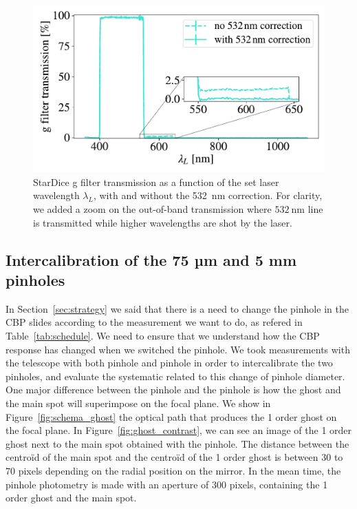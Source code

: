 \begin{figure}[h]
    \centering
    \includegraphics[width=\columnwidth]{fig/g_filter_532.pdf}
    \caption{StarDice g filter transmission as a function of the set laser wavelength $\lambda_L$, with and without the \SI{532}{\nm} correction. For clarity, we added a zoom on the out-of-band transmission where $\SI{532}{\nm}$ line is transmitted while higher wavelengths are shot by the laser.}
    \label{fig:g_filter_532}
\end{figure}

\subsection{Intercalibration of the 75 µm and 5 mm pinholes}

In Section~\ref{sec:strategy} we said that there is a need to change the pinhole in the CBP slides according to the measurement we want to do, as refered in Table~\ref{tab:schedule}. We need to ensure that we understand how the CBP response has changed when we switched the pinhole. We took measurements with the \SD telescope with both \bpinhole pinhole and \spinhole pinhole in order to intercalibrate the two pinholes, and evaluate the systematic related to this change of pinhole diameter. One major difference between the \spinhole pinhole and the \bpinhole pinhole is how the ghost and the main spot will superimpose on the focal plane.  We show in Figure~\ref{fig:schema_ghost} the optical path that produces the 1 order ghost on the focal plane. In Figure~\ref{fig:ghost_contrast}, we can see an image of the 1 order ghost next to the main spot obtained with the \spinhole pinhole. The distance between the centroïd of the main spot and the centroïd of the 1 order ghost is between 30 to 70 pixels depending on the radial position on the mirror. In the mean time, the \bpinhole pinhole photometry is made with an aperture of 300 pixels, containing the 1 order ghost and the main spot. 

